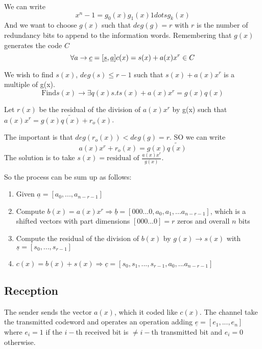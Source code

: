  We can write 
 \begin{equation}
 x^n - 1 = g_0(x)g_1(x)1dots g_k(x)
 \end{equation}
 And we want to choose $g(x)$ such that $deg(g) = r$ with $r$ is the number of redundancy bits to append to the information words. Remembering that $g(x)$ generates the code $C$
\begin{equation}
\forall a \rightarrow \underline{c} = [\underline{s},\underline{a}]\\
c(x) = s(x) + a(x)x^r \in C
\end{equation}

We wish to find $s(x)$, $deg(s) \leq r - 1$ such that $s(x) + a(x)x^r$ is a multiple of g(x).
\begin{equation}
\text{Find} s(x) \rightarrow \exists q(x) s.t s(x)+a(x)x^r = g(x)q(x)
\end{equation}

Let $r(x)$ be the residual of the division of $a(x)x^r$ by g(x) such that $a(x)x^r = g(x)\widetilde{q(x)} + r_o(x)$. 

The important is that $deg(r_o(x)) < deg(g) = r$. SO we can write 
\begin{equation}
a(x)x^r + r_o(x) = g(x)\widetilde{q(x)}
\end{equation}
The solution is to take $s(x) = \text{residual of } \frac{a(x)x^r}{g(x)}$.

So the process can be sum up as follows:
\begin{enumerate}
\item Given $\underline{a} = [a_0, ..., a_{n-r-1}]$
\item Compute $b(x) = a(x)x^r \Rightarrow \underline{b} = [000...0,a_0,a_1,...a_{n-r-1}]$, which is a shifted vectors with part dimensions $[000...0] = r$ zeros and overall $n$ bits
\item Compute the residual of the division of $b(x)$ by $g(x) \rightarrow s(x)$ with $\underline{s} = [s_0,...,s_{r-1}]$
\item $c(x) = b(x) + s(x) \Rightarrow \underline{c} =  [s_0, s_1, ..., s_{r-1},a_0,...a_{n-r-1}]$
\end{enumerate}

\subsection{Reception}
The sender sends the vector $a(x)$, which it coded like $c(x)$. The channel take the transmitted codeword and operates an operation adding $\underline{e} = [e_1,...,e_n]$ where $e_i = 1$ if the $i-$th received bit is $\neq i-$th transmitted bit and $e_i = 0$ otherwise.

